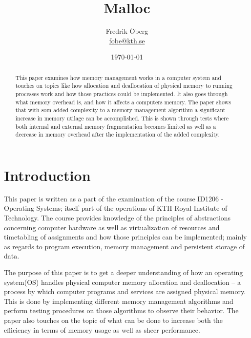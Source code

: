 \documentclass{article}
\begin{document}
\title{Malloc}
\author{Fredrik Öberg \\ \href{mailto:fobe@kth.se}{fobe@kth.se}}
\date{\today}
\maketitle

\begin{abstract}
This paper examines how memory management works in a computer system and touches on topics like how allocation and 
deallocation of physical memory to running processes work and how those practices could be implemented. It also goes through what 
memory overhead is, and how it affects a computers memory. The paper shows that with som added complexity to a memory 
management algorithm a significant increase in memory utilage can be accomplished. This is shown through tests where 
both internal and external memory fragmentation becomes limited as well as a decrease in memory overhead after the implementation
of the added complexity. 

\end{abstract}
\newpage
\tableofcontents
\newpage

\section{Introduction}
This paper is written as a part of the examination of the course ID1206 - Operating Systems; itself part 
of the operations of KTH Royal Institute of Technology. The course provides knowledge of the principles of 
abstractions concerning computer hardware as well as virtualization of resources and timetabling of assignments and
 how those principles can be implemented; mainly as regards to program execution, memory management and 
 persistent storage of data.

 The purpose of this paper is to get a deeper understanding of how an operating system(OS) handles physical 
computer memory allocation and deallocation – a process by which computer programs and services are assigned 
physical memory. This is done by implementing different memory management algorithms and perform testing procedures 
on those algorithms to observe their behavior. The paper also touches on the topic of what can be done 
to increase both the efficiency in terms of memory usage as well as sheer performance. 
\end{document}
